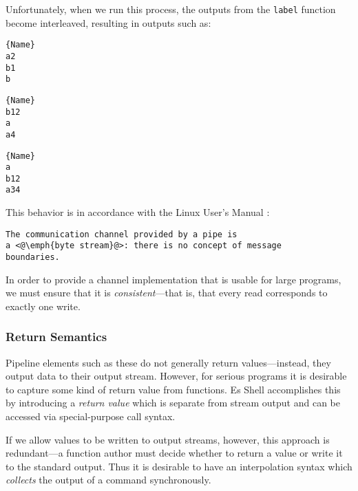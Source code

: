 \documentclass[english,PRO]{ipsj}
\begin{document}
\noindent
Unfortunately, when we run this process, the outputs from the \verb/label/ function become interleaved, resulting in outputs such as:

\noindent\begin{minipage}{.14\textwidth}
\begin{lstlisting}{Name}
a2
b1
b
\end{lstlisting}
\end{minipage}\hfill
\begin{minipage}{.14\textwidth}
\begin{lstlisting}{Name}
b12
a
a4
\end{lstlisting}
\end{minipage}\hfill
\begin{minipage}{.14\textwidth}
\begin{lstlisting}{Name}
a
b12
a34
\end{lstlisting}
\end{minipage}

\noindent
This behavior is in accordance with the Linux User's Manual \cite{linux-pipe}:
\begin{lstlisting}
The communication channel provided by a pipe is
a <@\emph{byte stream}@>: there is no concept of message
boundaries.
\end{lstlisting}

\noindent
In order to provide a channel implementation that is usable for large programs, we must ensure that it is \emph{consistent}---that is, that every read corresponds to exactly one write.

\subsubsection{Return Semantics}\label{return-semantics}\noindent
Pipeline elements such as these do not generally return values---instead, they output data to their output stream. However, for serious programs it is desirable to capture some kind of return value from functions. Es Shell\cite{haahr} accomplishes this by introducing a \emph{return value} which is separate from stream output and can be accessed via special-purpose call syntax.

If we allow values to be written to output streams, however, this approach is redundant---a function author must decide whether to return a value or write it to the standard output. Thus it is desirable to have an interpolation syntax which \emph{collects} the output of a command synchronously.
\end{document}
